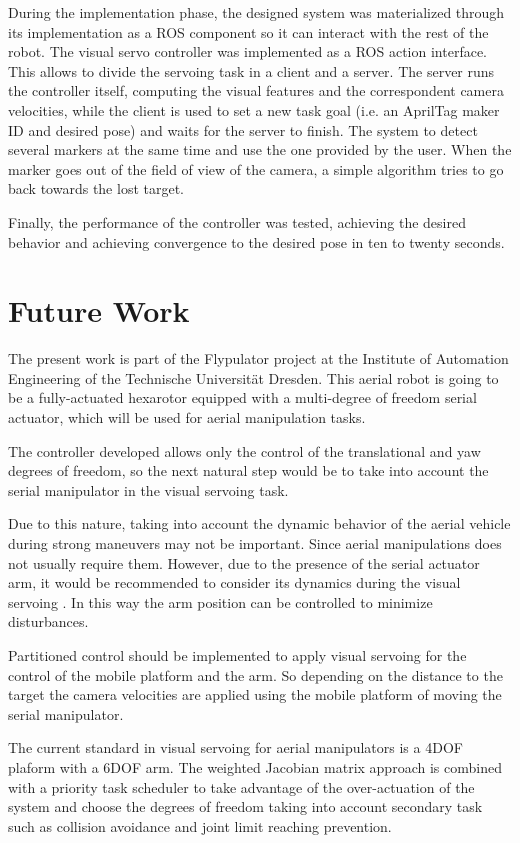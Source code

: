 During the implementation phase, the designed system was materialized through its implementation as a ROS component so it can interact with the rest of the robot. The visual servo controller was implemented as a ROS action interface. This allows to divide the servoing task in a client and a server. The server runs the controller itself, computing the visual features and the correspondent camera velocities, while the client is used to set a new task goal (i.e. an AprilTag maker ID and desired pose)  and waits for the server to finish. The system to detect several markers at the same time and use the one provided by the user. When the marker goes out of the field of view of the camera, a simple algorithm tries to go back towards the lost target.

Finally, the performance of the controller was tested, achieving the desired behavior and achieving convergence to the desired pose in ten to twenty seconds.

\section{Future Work}

The present work is part of the Flypulator project at the Institute of Automation Engineering of the Technische Universität Dresden. This aerial robot is going to be a fully-actuated hexarotor equipped with a multi-degree of freedom serial actuator, which will be used for aerial manipulation tasks.

The controller developed allows only the control of the translational and yaw degrees of freedom, so the next natural step would be to take into account the serial manipulator in the visual servoing task.

Due to this nature, taking into account the dynamic behavior of the aerial vehicle during strong maneuvers may not be important. Since aerial manipulations does not usually require them. However, due to the presence of the serial actuator arm, it would be recommended to consider its dynamics during the visual servoing . In this way the arm position can be controlled to minimize disturbances.

Partitioned control should be implemented to apply visual servoing for the control of the mobile platform and the arm. So depending on the distance to the target the camera velocities are applied using the mobile platform of moving the serial manipulator.

The current standard in visual servoing for aerial manipulators is a 4DOF plaform with a 6DOF arm. The weighted Jacobian matrix approach is combined with a priority task scheduler to take advantage of the over-actuation of the system and choose the degrees of freedom taking into account secondary task such as collision avoidance and joint limit reaching prevention.

